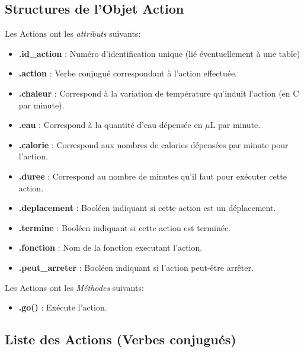\documentclass[french]{report}
\newlength{\du}\fi
\begin{document}
\subsection{Structures de l'Objet Action}
Les Actions ont les \textit{attributs} suivants:
\begin{itemize}
	\item \textbf{.id\_action} : Numéro d'identification unique (lié éventuellement à une table)
	\item \textbf{.action} : Verbe conjugué correspondant à l'action effectuée.
	\item \textbf{.chaleur} : Correspond à la variation de température qu'induit l'action  (en \degres C par minute).
	\item \textbf{.eau}  : Correspond à la quantité d'eau dépensée en $\mu$L par minute.
	\item \textbf{.calorie} : Correspond aux nombres de calories dépensées par minute pour l'action.
	\item \textbf{.duree} : Correspond au nombre de minutes qu'il faut pour exécuter cette action.
	\item \textbf{.deplacement} : Booléen indiquant si cette action est un déplacement.
	\item \textbf{.termine} : Booléen indiquant si cette action est terminée.
	\item \textbf{.fonction} : Nom de la fonction executant l'action.
	\item \textbf{.peut\_arreter} : Booléen indiquant si l'action peut-être arrêter.\\
\end{itemize}
Les Actions ont les \textit{Méthodes} suivants:
\begin{itemize}
	\item \textbf{.go()} : Exécute l'action.
\end{itemize}
\subsection{Liste des Actions (Verbes conjugués)}
\end{document}
